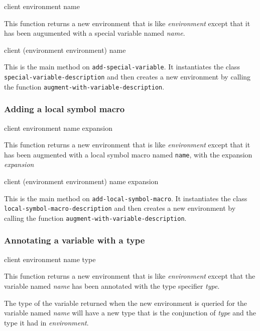 {\footnotesize
{} {client environment name}
}

This function returns a new environment that is like
\textit{environment} except that it has been augumented with a special
variable named \textit{name}.

{\footnotesize
{}
{client
 (environment environment)
 name}
}

This is the main method on \texttt{add-special-variable}.  It
instantiates the class \texttt{special-variable-description} and then
creates a new environment by calling the function
\texttt{augment-with-variable-description}.


\subsubsection{Adding a local symbol macro}

{\footnotesize
{} {client environment name expansion}
}

This function returns a new environment that is like
\textit{environment} except that it has been augmented with a local
symbol macro named \texttt{name}, with the expansion
\textit{expansion}

{\footnotesize
{}
{client
 (environment environment)
 name
 expansion}
}

This is the main method on \texttt{add-local-symbol-macro}.  It
instantiates the class \texttt{local-symbol-macro-description} and then
creates a new environment by calling the function
\texttt{augment-with-variable-description}.

\subsubsection{Annotating a variable with a type}
\label{sec-annotating-a-variable-with-a-type}

{\footnotesize
{} {client environment name type}
}

This function returns a new environment that is like
\textit{environment} except that the variable named \textit{name} has
been annotated with the type specifier \textit{type}.

The type of the variable returned when the new environment is queried
for the variable named \textit{name} will have a new type that is the
conjunction of \textit{type} and the type it had in
\textit{environment}.

